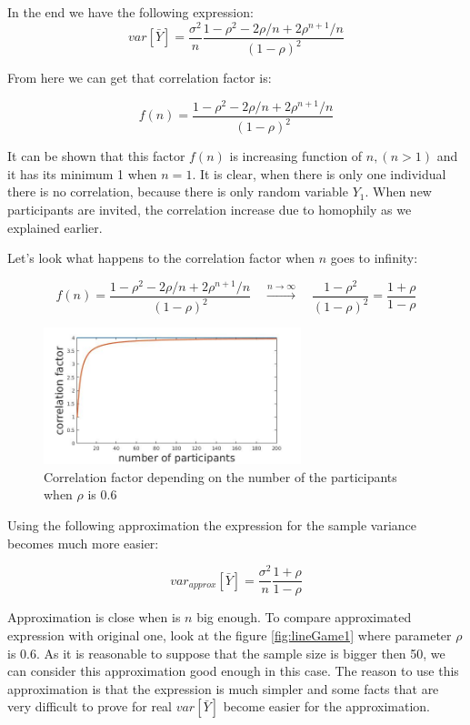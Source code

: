 \documentclass[12pt]{report}
\begin{document}
In the end we have the following expression:
\begin{equation}\label{eq:varFirst}
var\left[\bar{Y} \right] = \frac{\sigma^2}{n}\frac{1-\rho^2 - 2\rho/n + 2\rho^{n+1}/n}{(1-\rho)^2}
\end{equation}


From here we can get that correlation factor is:

$$f(n) = \frac{1-\rho^2 - 2\rho/n + 2\rho^{n+1}/n}{(1-\rho)^2} $$

It can be shown that this factor $f(n)$ is increasing function of $n, (n > 1)$ and it has its minimum 1 when $n = 1$. It is clear, when there is only one individual there is no correlation, because there is only random variable $Y_1$. When new participants are invited, the correlation increase due to homophily as we explained earlier.

Let's look what happens to the correlation factor when $n$ goes to infinity:

$$f(n)  = \frac{1-\rho^2 - 2\rho/n + 2\rho^{n+1}/n}{(1-\rho)^2} \quad \xrightarrow{n\to \infty} \quad\frac{1-\rho^2}{(1-\rho)^2} = \frac{1+\rho}{1-\rho}$$

\begin{figure}[ht]
    \centering
    \includegraphics[height=150px]{corrFactor}
    \caption{ Correlation factor depending on the number of the participants when $\rho$ is 0.6 }
\end{figure}

Using the following approximation the expression for the sample variance becomes much more easier:

$$var_{approx}\left[\bar{Y} \right] = \frac{\sigma^2}{n} \frac{1+\rho}{1-\rho}$$


Approximation is close when is $n$ big enough. To compare approximated expression with original one, look at the figure \ref{fig:lineGame1} where parameter $\rho$ is $0.6$. As it is reasonable to suppose that the sample size is bigger then 50, we can consider this approximation good enough in this case. The reason to use this approximation is that the expression is much simpler and some facts that are very difficult to prove for real $var\left[\bar{Y} \right]$ become easier for the approximation.
\end{document}
